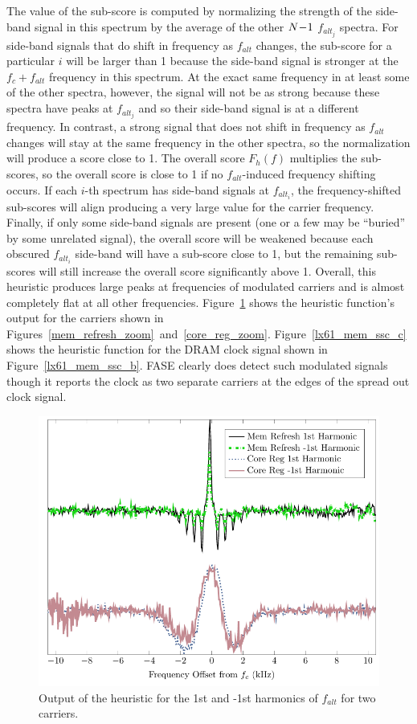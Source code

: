 The value of the sub-score is computed by normalizing the strength of the side-band signal in this spectrum by the average of the other \hskip2pt $N\hskip-2pt -\hskip-2pt 1$ \hskip2pt $f_{alt_j}$ spectra. For side-band signals that do shift in frequency as $f_{alt}$ changes, the sub-score for a particular $i$ will be larger than 1 because the side-band signal is stronger at the $f_c+f_{alt}$ frequency in this spectrum. At the exact same frequency in at least some of the other spectra, however, the signal will not be as strong because these spectra have peaks at $f_{alt_j}$ and so their side-band signal is at a different frequency. In contrast, a strong signal that does not shift in frequency as $f_{alt}$ changes will stay at the same frequency in the other spectra, so the normalization will produce a score close to 1. The overall score $F_h(f)$ multiplies the sub-scores, so the overall score is close to 1 if no $f_{alt}$-induced frequency shifting occurs. If each $i$-th spectrum has side-band signals at $f_{alt_i}$, the frequency-shifted sub-scores will align producing a very large value for the carrier frequency. Finally, if only some side-band signals are present (one or a few may be ``buried'' by some unrelated signal), the overall score will be weakened because each obscured $f_{alt_i}$ side-band will have a sub-score close to 1, but the remaining sub-scores will still increase the overall score significantly above 1. Overall, this heuristic produces large peaks at frequencies of modulated carriers and is almost completely flat at all other frequencies. Figure~\ref{filter} shows the heuristic function's output for the carriers shown in Figures~\ref{mem_refresh_zoom}~and~\ref{core_reg_zoom}. Figure~\ref{lx61_mem_ssc_c} shows the heuristic function for the DRAM clock signal shown in Figure~\ref{lx61_mem_ssc_b}. FASE clearly does detect such modulated signals though it reports the clock as two separate carriers at the edges of the spread out clock signal.

\begin{figure}[htb]
  \centering
    \includegraphics[width=5in]{../fase/Data/filter.pdf}%
  \caption{Output of the heuristic for the 1st and -1st harmonics of $f_{alt}$ for two carriers.}%
  \label{filter}
\end{figure}

